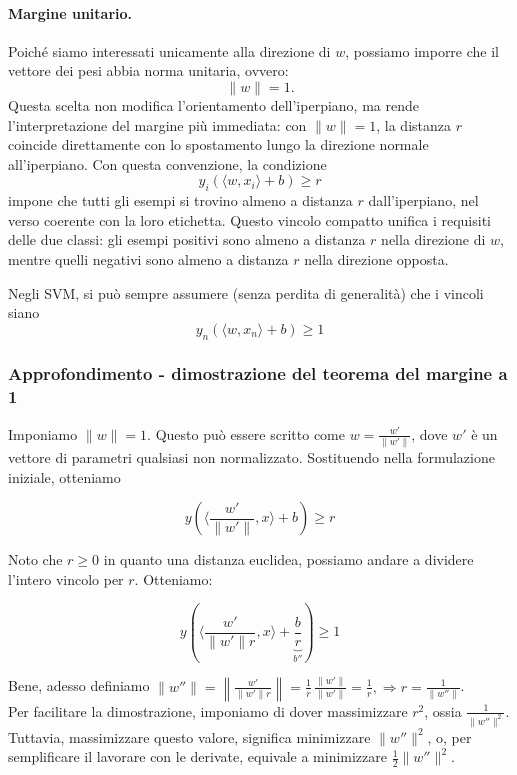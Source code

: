 \paragraph{Margine unitario.} 
Poiché siamo interessati unicamente alla direzione di $w$, possiamo imporre che il vettore dei pesi abbia norma unitaria, ovvero:
\[
\|w\| = 1 .
\]
Questa scelta non modifica l'orientamento dell'iperpiano, ma rende l'interpretazione del margine più immediata: con $\|w\| = 1$, la distanza $r$ coincide direttamente con lo spostamento lungo la direzione normale all'iperpiano.
Con questa convenzione, la condizione
\[
y_i (\langle w, x_i \rangle + b) \ge r
\]
impone che tutti gli esempi si trovino almeno a distanza $r$ dall'iperpiano, nel verso coerente con la loro etichetta. Questo vincolo compatto unifica i requisiti delle due classi: gli esempi positivi sono almeno a distanza $r$ nella direzione di $w$, mentre quelli negativi sono almeno a distanza $r$ nella direzione opposta. 

Negli SVM, si può sempre assumere (senza perdita di generalità) che i vincoli siano
$$
y_n(\langle w, x_n\rangle + b) \geq 1
$$

\subsubsection{Approfondimento - dimostrazione del teorema del margine a 1}

Imponiamo $\|w\| = 1$. Questo può essere scritto come $ \displaystyle w = \frac{w'}{\|w'\|}$, dove $w'$ è un vettore di parametri qualsiasi non normalizzato. Sostituendo nella formulazione iniziale, otteniamo

$$
y \left(\Big\langle \frac{w'}{\|w'\|}, x\Big\rangle + b\right) \geq r
$$

Noto che $r \geq 0$ in quanto una distanza euclidea, possiamo andare a dividere l'intero vincolo per $r$. Otteniamo:

$$
y \left(\Big\langle \frac{w'}{\|w'\|r}, x\Big\rangle + \underbrace{\frac{b}{r}}_{b''} \right) \geq 1
$$

Bene, adesso definiamo $\displaystyle \|w''\|
= \left\|\frac{w'}{\|w'\| r}\right\|
= \frac{1}{r}\,\frac{\|w'\|}{\|w'\|}
= \frac{1}{r}, \Rightarrow r = \frac{1}{\| w''\|}$. \\
Per facilitare la dimostrazione, imponiamo di dover massimizzare $r^2$, ossia  $\displaystyle\frac{1}{\|w''\|^2}$. Tuttavia, massimizzare questo valore, significa minimizzare  $\|w''\|^2$, o, per semplificare il lavorare con le derivate, equivale a minimizzare $\displaystyle\frac{1}{2} \|w''\|^2$.


